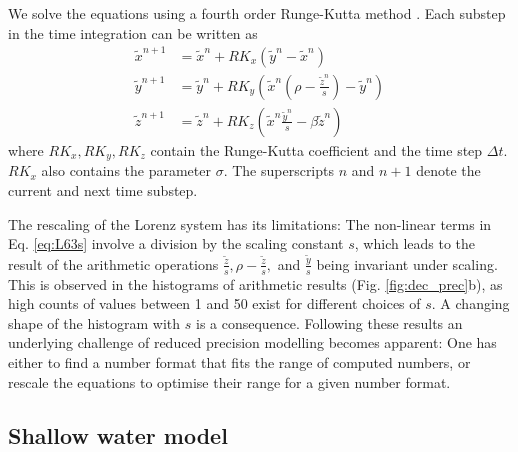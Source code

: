 \documentclass[draft]{agujournal2019}
\begin{document}
We solve the equations using a fourth order Runge-Kutta method \cite{Butcher2016}. Each substep in the time integration can be written as
\begin{subequations}
\begin{align}
\tilde{x}^{n+1} &= \tilde{x}^n + RK_x\left(\tilde{y}^n-\tilde{x}^n\right) \\
\tilde{y}^{n+1} &= \tilde{y}^n + RK_y\left(\tilde{x}^n(\rho - \frac{\tilde{z}^n}{s}) - \tilde{y}^n \right) \\
\tilde{z}^{n+1} &= \tilde{z}^n + RK_z\left(\tilde{x}^n\frac{\tilde{y}^n}{s} - \beta \tilde{z}^n\right)
\end{align}
\label{eq:L63s}%
\end{subequations}
where $RK_x,RK_y,RK_z$ contain the Runge-Kutta coefficient and the time step $\Delta t$. $RK_x$ also contains the parameter $\sigma$. The superscripts $n$ and $n+1$ denote the current and next time substep.

The rescaling of the Lorenz system has its limitations: The non-linear terms in Eq. \ref{eq:L63s} involve a division by the scaling constant $s$, which leads to the result of the arithmetic operations $\tfrac{\tilde{z}}{s}, \rho - \tfrac{\tilde{z}}{s},$ and $\tfrac{\tilde{y}}{s}$ being invariant under scaling. This is observed in the histograms of arithmetic results (Fig. \ref{fig:dec_prec}b), as high counts of values between 1 and 50 exist for different choices of $s$. A changing shape of the histogram with $s$ is a consequence. Following these results an underlying challenge of reduced precision modelling becomes apparent: One has either to find a number format that fits the range of computed numbers, or rescale the equations to optimise their range for a given number format.

\subsection{Shallow water model}
\label{sec:swm}
\end{document}
